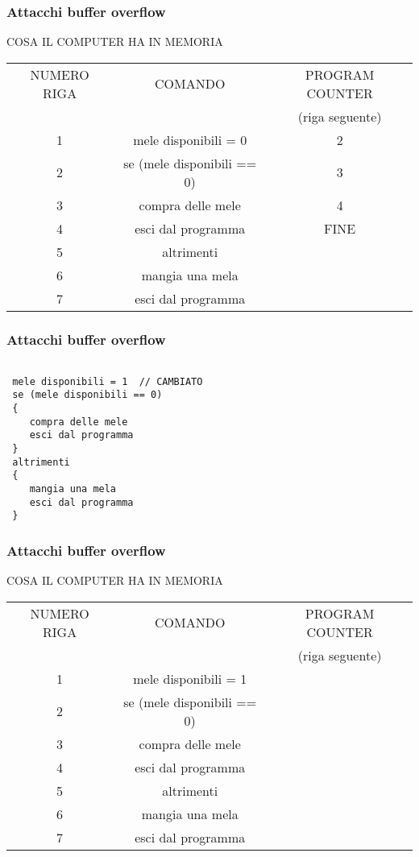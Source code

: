\documentclass[italian,aspectratio=169]{beamer}
\begin{document}
\begin{frame}
 \frametitle{Attacchi buffer overflow}
 COSA IL COMPUTER HA IN MEMORIA
 \begin{center}
 \begin{tabular}{|c|c|c|}
\hline 
{NUMERO RIGA} & {COMANDO} & {PROGRAM COUNTER}\tabularnewline
{}&{}&{(riga seguente)}\tabularnewline
\hline 
\hline 
{1} & {mele disponibili = 0} & {2}\tabularnewline
\hline
{2} & {se (mele disponibili == 0)} & {3}\tabularnewline
\hline
{3} & {compra delle mele} & {4}\tabularnewline
\hline
{4} & {esci dal programma} & {FINE}\tabularnewline
\hline
{5} & {altrimenti} & {}\tabularnewline
\hline
{6} & {mangia una mela} & {}\tabularnewline
\hline
{7} & {esci dal programma} & {}\tabularnewline
\hline 
\end{tabular}
\end{center}
\end{frame}















\begin{frame}[fragile]
 \frametitle{Attacchi buffer overflow}
\begin{verbatim}

 mele disponibili = 1  // CAMBIATO
 se (mele disponibili == 0)
 {
    compra delle mele
    esci dal programma
 }
 altrimenti
 {
    mangia una mela
    esci dal programma
 }
\end{verbatim}
\end{frame}

\begin{frame}
 \frametitle{Attacchi buffer overflow}
 COSA IL COMPUTER HA IN MEMORIA
 \begin{center}
 \begin{tabular}{|c|c|c|}
\hline 
{NUMERO RIGA} & {COMANDO} & {PROGRAM COUNTER}\tabularnewline
{}&{}&{(riga seguente)}\tabularnewline
\hline 
\hline 
{1} & {mele disponibili = 1} & {}\tabularnewline
\hline
{2} & {se (mele disponibili == 0)} & {}\tabularnewline
\hline
{3} & {compra delle mele} & {}\tabularnewline
\hline
{4} & {esci dal programma} & {}\tabularnewline
\hline
{5} & {altrimenti} & {}\tabularnewline
\hline
{6} & {mangia una mela} & {}\tabularnewline
\hline
{7} & {esci dal programma} & {}\tabularnewline
\hline 
\end{tabular}
\end{center}
\end{frame}
\end{document}
